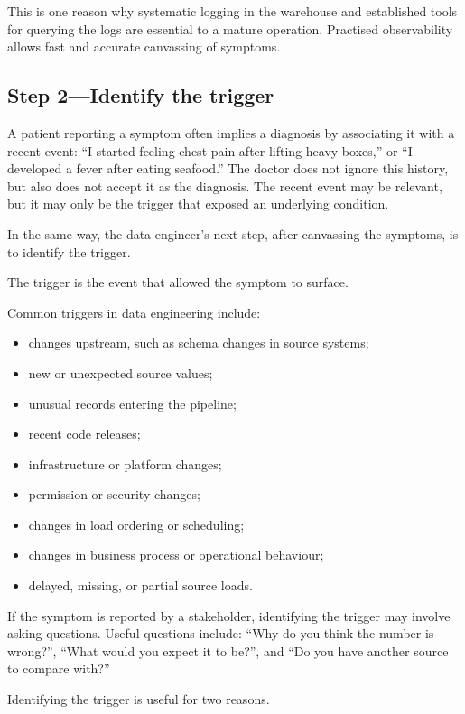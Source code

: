 \documentclass[10pt,openany,10pt]{book}
\providecommand{\tightlist}{%
  \setlength{\itemsep}{0pt}\setlength{\parskip}{0pt}}
\begin{document}
This is one reason why systematic logging in the warehouse and
established tools for querying the logs are essential to a mature
operation. Practised observability allows fast and accurate canvassing
of symptoms.

\subsection{Step 2---Identify the
trigger}\label{step-2identify-the-trigger}

A patient reporting a symptom often implies a diagnosis by associating
it with a recent event: ``I started feeling chest pain after lifting
heavy boxes,'' or ``I developed a fever after eating seafood.'' The
doctor does not ignore this history, but also does not accept it as the
diagnosis. The recent event may be relevant, but it may only be the
trigger that exposed an underlying condition.

In the same way, the data engineer's next step, after canvassing the
symptoms, is to identify the trigger.

The trigger is the event that allowed the symptom to surface.

Common triggers in data engineering include:

\begin{itemize}
\tightlist
\item
  changes upstream, such as schema changes in source systems;
\item
  new or unexpected source values;
\item
  unusual records entering the pipeline;
\item
  recent code releases;
\item
  infrastructure or platform changes;
\item
  permission or security changes;
\item
  changes in load ordering or scheduling;
\item
  changes in business process or operational behaviour;
\item
  delayed, missing, or partial source loads.
\end{itemize}

If the symptom is reported by a stakeholder, identifying the trigger may
involve asking questions. Useful questions include: ``Why do you think
the number is wrong?'', ``What would you expect it to be?'', and ``Do
you have another source to compare with?''

Identifying the trigger is useful for two reasons.
\end{document}
